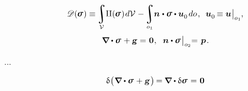 \nopagebreak
\begin{equation}\label{thecomplementaryenergyfunctional}
\complementaryenergyfunctional (\hspace{-0.1ex}\linearstress\hspace{.1ex})
\equiv \hspace{-0.2ex}
\displaystyle \integral\displaylimits_{\mathcal{V}} \hspace{-0.5ex}
\complementaryenergydensity(\hspace{-0.1ex}\linearstress\hspace{.1ex}) \hspace{.2ex} d\mathcal{V} \hspace{.1ex}
- \hspace{-0.2ex}
\displaystyle\integral\displaylimits_{o_1} \hspace{-0.5ex}
\unitnormalvector \hspace{.1ex} \dotp \linearstress \dotp \bm{u}_{\raisemath{-0.1em}{0}} \hspace{.25ex} do
\hspace{.2ex} ,
\hspace{.5em}
\bm{u}_{\raisemath{-0.1em}{0}} \hspace{-0.2ex} \equiv \bm{u} \hspace{.1ex} \bigr|_{o_1}
\hspace{-0.1ex} ,
\end{equation}
%
\nopagebreak\vspace{-0.4em}\begin{equation*}
\boldnabla \dotp \linearstress \hspace{.15ex} + \volumeloadvector = \hspace{.1ex} \zerovector \hspace{.1ex} ,
\hspace{.6em}
\unitnormalvector \dotp \linearstress \hspace{.2ex} \bigr|_{o_2} \hspace{-0.66ex} = \hspace{.2ex} \bm{p}
\hspace{.2ex} .
\end{equation*}

...


\noindent
\begin{equation*}\label{the variation of the balance of force equation}
\variation{\hspace{.1ex} \bigl( \hspace{.1ex}
\boldnabla \dotp \linearstress
\hspace{.15ex} +
\volumeloadvector
\hspace{.15ex} \bigr)} \hspace{-0.2ex}
= \hspace{-0.1ex}
\boldnabla \dotp \variation{\linearstress} \hspace{.15ex}
= \hspace{.1ex} \zerovector
\end{equation*}

